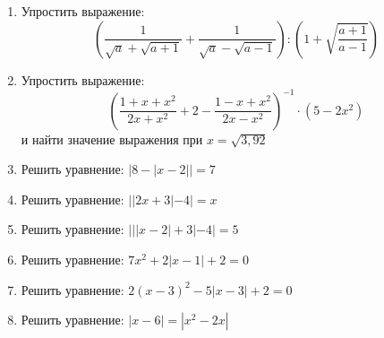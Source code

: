 \documentclass[12pt, a5paper]{article}
\begin{document}
	
\begin{enumerate}
	\item Упростить выражение: \[ \left(\dfrac{1}{\sqrt{a}+\sqrt{a+1}}+\dfrac{1}{\sqrt{a}-\sqrt{a-1}}\right):\left(1+\sqrt{\dfrac{a+1}{a-1}}\right) \]
	\item Упростить выражение:\[ \left(\dfrac{1+x+x^2}{2x+x^2} + 2 - \dfrac{1-x+x^2}{2x-x^2}\right)^{-1}\cdot(5-2x^2) \] и найти значение выражения при \( x=\sqrt{3,92} \)
	\item Решить уравнение: \( |8-|x-2|| = 7\)
	\item Решить уравнение: \( ||2x+3| -4| = x\)
	\item Решить уравнение: \( |||x-2| + 3| - 4| = 5 \)
	\item Решить уравнение: \( 7x^2+2|x-1|+2=0 \)
	\item Решить уравнение: \( 2(x-3)^2-5|x-3|+2=0 \)
	\item Решить уравнение: \( |x-6|=|x^2-2x| \)
\end{enumerate}
\end{document}
